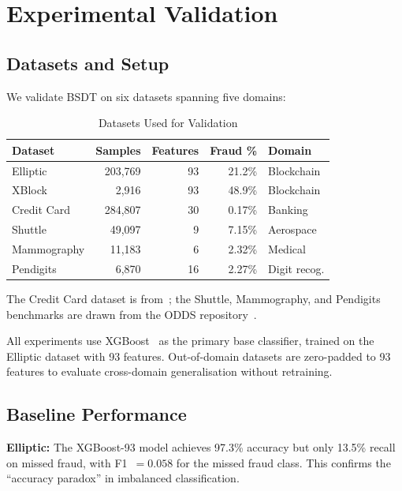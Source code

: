 \documentclass[journal]{IEEEtran}
\begin{document}
\section{Experimental Validation}
\label{sec:experiments}

\subsection{Datasets and Setup}
\label{ssec:setup}

We validate BSDT on six datasets spanning five domains:

\begin{table}[!t]
\centering
\caption{Datasets Used for Validation}
\label{tab:datasets}
\begin{tabular}{@{}lrrrl@{}}
\toprule
\textbf{Dataset} & \textbf{Samples} & \textbf{Features} & \textbf{Fraud \%} & \textbf{Domain} \\
\midrule
Elliptic      & 203{,}769 & 93  & 21.2\% & Blockchain \\
XBlock        & 2{,}916   & 93  & 48.9\% & Blockchain \\
Credit Card   & 284{,}807 & 30  & 0.17\% & Banking \\
Shuttle       & 49{,}097  & 9   & 7.15\% & Aerospace \\
Mammography   & 11{,}183  & 6   & 2.32\% & Medical \\
Pendigits     & 6{,}870   & 16  & 2.27\% & Digit recog. \\
\bottomrule
\end{tabular}
\end{table}

The Credit Card dataset is from~\cite{dalpozzolo2015}; the Shuttle, Mammography, and Pendigits benchmarks are drawn from the ODDS repository~\cite{rayana2016}.

All experiments use XGBoost~\cite{chen2016xgboost} as the primary base classifier, trained on the Elliptic dataset with 93 features. Out-of-domain datasets are zero-padded to 93 features to evaluate cross-domain generalisation without retraining.

\subsection{Baseline Performance}
\label{ssec:baseline}

\textbf{Elliptic:} The XGBoost-93 model achieves 97.3\% accuracy but only 13.5\% recall on missed fraud, with F1~$= 0.058$ for the missed fraud class. This confirms the ``accuracy paradox'' in imbalanced classification.
\end{document}
